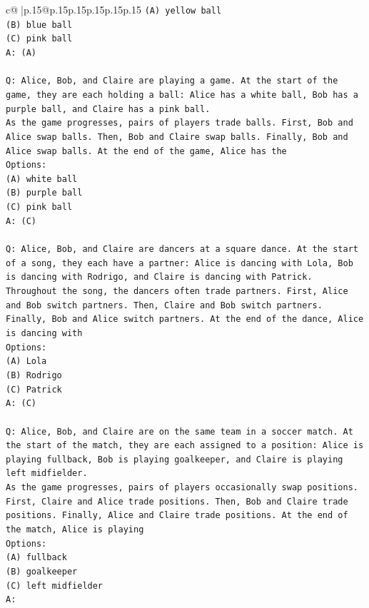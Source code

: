 \documentclass{article}
\begin{document}
{\begin{supertabular}{c@{$\;$}|p{.15\linewidth}@{}p{.15\linewidth}p{.15\linewidth}p{.15\linewidth}p{.15\linewidth}p{.15\linewidth}}
{{{\texttt{(A) yellow ball} \\
\texttt{(B) blue ball} \\
\texttt{(C) pink ball} \\
\texttt{A: (A)} \\
\\ 
\texttt{Q: Alice, Bob, and Claire are playing a game. At the start of the game, they are each holding a ball: Alice has a white ball, Bob has a purple ball, and Claire has a pink ball.} \\
\texttt{As the game progresses, pairs of players trade balls. First, Bob and Alice swap balls. Then, Bob and Claire swap balls. Finally, Bob and Alice swap balls. At the end of the game, Alice has the} \\
\texttt{Options:} \\
\texttt{(A) white ball} \\
\texttt{(B) purple ball} \\
\texttt{(C) pink ball} \\
\texttt{A: (C)} \\
\\ 
\texttt{Q: Alice, Bob, and Claire are dancers at a square dance. At the start of a song, they each have a partner: Alice is dancing with Lola, Bob is dancing with Rodrigo, and Claire is dancing with Patrick.} \\
\texttt{Throughout the song, the dancers often trade partners. First, Alice and Bob switch partners. Then, Claire and Bob switch partners. Finally, Bob and Alice switch partners. At the end of the dance, Alice is dancing with} \\
\texttt{Options:} \\
\texttt{(A) Lola} \\
\texttt{(B) Rodrigo} \\
\texttt{(C) Patrick} \\
\texttt{A: (C)} \\
\\ 
\texttt{Q: Alice, Bob, and Claire are on the same team in a soccer match. At the start of the match, they are each assigned to a position: Alice is playing fullback, Bob is playing goalkeeper, and Claire is playing left midfielder.} \\
\texttt{As the game progresses, pairs of players occasionally swap positions. First, Claire and Alice trade positions. Then, Bob and Claire trade positions. Finally, Alice and Claire trade positions. At the end of the match, Alice is playing} \\
\texttt{Options:} \\
\texttt{(A) fullback} \\
\texttt{(B) goalkeeper} \\
\texttt{(C) left midfielder} \\
\texttt{A:} \\
            }
        }
    }
     \\ \\


\end{supertabular}}
\end{document}
